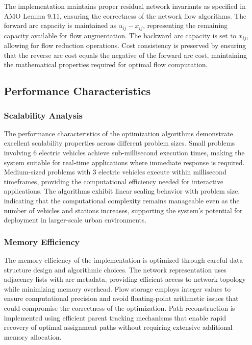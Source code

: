 \documentclass[12pt,a4paper]{article}
\begin{document}
The implementation maintains proper residual network invariants as specified in AMO Lemma 9.11, ensuring the correctness of the network flow algorithms. The forward arc capacity is maintained as $u_{ij} - x_{ij}$, representing the remaining capacity available for flow augmentation. The backward arc capacity is set to $x_{ij}$, allowing for flow reduction operations. Cost consistency is preserved by ensuring that the reverse arc cost equals the negative of the forward arc cost, maintaining the mathematical properties required for optimal flow computation.

\subsection{Performance Characteristics}

\subsubsection{Scalability Analysis}

The performance characteristics of the optimization algorithms demonstrate excellent scalability properties across different problem sizes. Small problems involving 6 electric vehicles achieve sub-millisecond execution times, making the system suitable for real-time applications where immediate response is required. Medium-sized problems with 3 electric vehicles execute within millisecond timeframes, providing the computational efficiency needed for interactive applications. The algorithms exhibit linear scaling behavior with problem size, indicating that the computational complexity remains manageable even as the number of vehicles and stations increases, supporting the system's potential for deployment in larger-scale urban environments.

\subsubsection{Memory Efficiency}

The memory efficiency of the implementation is optimized through careful data structure design and algorithmic choices. The network representation uses adjacency lists with arc metadata, providing efficient access to network topology while minimizing memory overhead. Flow storage employs integer values to ensure computational precision and avoid floating-point arithmetic issues that could compromise the correctness of the optimization. Path reconstruction is implemented using efficient parent tracking mechanisms that enable rapid recovery of optimal assignment paths without requiring extensive additional memory allocation.
\end{document}
